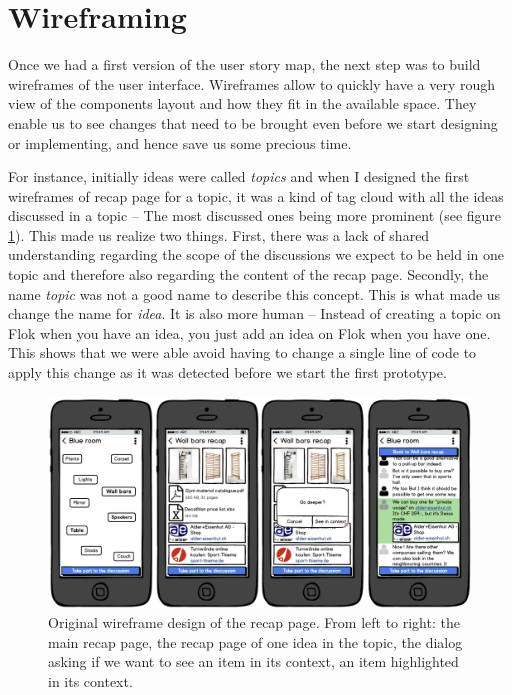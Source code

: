 \documentclass[a4paper,12pt, oneside]{article}
\begin{document}
\clearpage

\section{Wireframing}
Once we had a first version of the user story map, the next step was to build wireframes of the user interface.
Wireframes allow to quickly have a very rough view of the components layout and how they fit in the available space.
They enable us to see changes that need to be brought even before we start designing or implementing, and hence save us some precious time.

For instance, initially ideas were called \emph{topics} and when I designed the first wireframes of recap page for a topic, it was a kind of tag cloud with all the ideas discussed in a topic – The most discussed ones being more prominent (see figure \ref{fig.originalRecapWireframes}).
This made us realize two things.
First, there was a lack of shared understanding regarding the scope of the discussions we expect to be held in one topic and therefore also regarding the content of the recap page.
Secondly, the name \emph{topic} was not a good name to describe this concept.
This is what made us change the name for \emph{idea}. It is also more human – Instead of creating a topic on Flok when you have an idea, you just add an idea on Flok when you have one.
This shows that we were able avoid having to change a single line of code to apply this change as it was detected before we start the first prototype.

\begin{figure}[!htb]
\centering
\includegraphics[width=\textwidth]{images/originalRecapWireframes.png}
\caption{Original wireframe design of the recap page. From left to right: the main recap page, the recap page of one idea in the topic, the dialog asking if we want to see an item in its context, an item highlighted in its context.}
\label{fig.originalRecapWireframes}
\end{figure}
\end{document}
